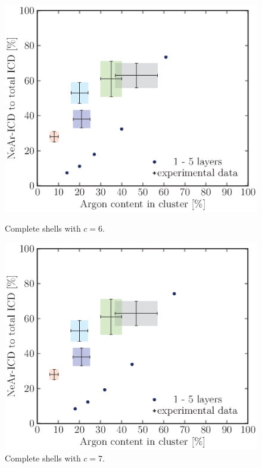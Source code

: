 \begin{figure}[!h]
\begin{minipage}{0.48\textwidth}
    \centering
    \includegraphics[scale=0.5]{pics/compl06.ps}
    \caption{Complete shells with $c=6$.}
    \label{compl06}
\end{minipage}
\hfill
\begin{minipage}{0.48\textwidth}
    \centering
    \includegraphics[scale=0.5]{pics/compl07.ps}
    \caption{Complete shells with $c=7$.}
    \label{compl07}
\end{minipage}
\end{figure}

